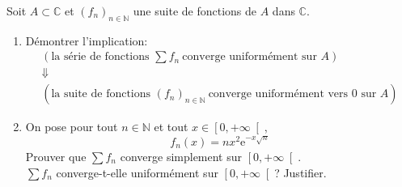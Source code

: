 \documentclass[a4paper,10pt]{report}
\begin{document}
\begin{Exa} Soit $A\subset \mathbb{C}$ et $\left( f_{n}\right)_{n\in \mathbb{N}}$ une suite de fonctions de $A$ dans $\mathbb{C}$.

\begin{enumerate}
\item D\'{e}montrer l'implication:
	\begin{eqnarray*}
	& \left( \text{la s\'{e}rie de fonctions }\displaystyle\sum f_{n}\ \text{converge uniform\'{e}ment sur $A$}\right)& \\
	&\Downarrow &\\
	&\left( \text{la suite de fonctions\ }\left( f_{n}\right) _{n\in \mathbb{N}}\ \text{converge uniform\'{e}ment vers 0 sur $A$}\right)&
	\end{eqnarray*}
\item
On pose pour tout $n\in\mathbb{N}$ et tout $x\in\left[ 0,+\infty\right[ $, 
$$f_n(x)=nx^2\mathrm{e}^{-x\sqrt{n}}$$
Prouver que $\displaystyle\sum f_n$ converge simplement sur $\left[ 0,+\infty\right[$.\\
$\displaystyle\sum f_n$ converge-t-elle uniformément sur $\left[ 0,+\infty\right[$? Justifier.
\end{enumerate}
\end{Exa}
\end{document}
